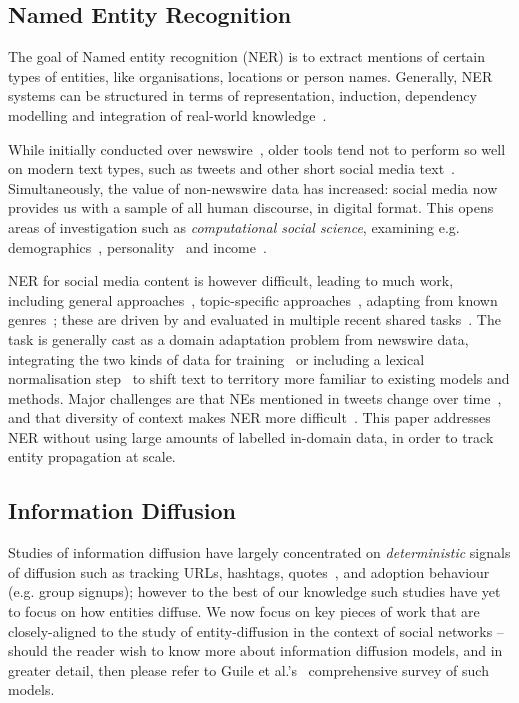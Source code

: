 \documentclass[acmsmall]{acmart}
\begin{document}
\subsection{Named Entity Recognition}
The goal of Named entity recognition (NER) is to extract mentions of certain types of entities, like organisations, locations or person names.
Generally, NER systems can be structured in terms of representation, induction, dependency modelling and integration of real-world knowledge~\cite{nadeau2007survey,ratinov2009design}.

While initially conducted over newswire~\cite{tjong2003introduction}, older tools tend not to perform so well on modern text types, such as tweets and other short social media text~\cite{derczynski2015analysis}.
Simultaneously, the value of non-newswire data has increased: social media now provides us with a sample of all human discourse, %
in digital format. This opens areas of investigation such as {\em computational social science}, examining e.g. demographics~\cite{hovy2015user}, personality~\cite{plank2015personality} and income~\cite{preoctiuc2015studying}.

NER for social media content is however difficult, leading to much work, including general approaches~\cite{ritter2011named}, topic-specific approaches~\cite{liu2011recognizing}, adapting from known genres~\cite{plank2014adapting}; these are driven by and evaluated in multiple recent shared tasks~\cite{rowe2015microposts2015,baldwin2015shared}.
The task is generally cast as a domain adaptation problem from newswire data, integrating the two kinds of data for training~\cite{cherryunreasonable} or including a lexical normalisation step~\cite{han2011lexical} to shift text to territory more familiar to existing models and methods.
Major challenges are that NEs mentioned in tweets change over time~\cite{fromreide2014crowdsourcing}, and that diversity of context makes NER more difficult~\cite{derczynski2015analysis}. 
This paper addresses NER without using large amounts of labelled in-domain data, in order to track entity propagation at scale.%

\subsection{Information Diffusion}
Studies of information diffusion have largely concentrated on \emph{deterministic} signals of diffusion such as tracking URLs, hashtags, quotes~\cite{suen2013nifty}, and adoption behaviour (e.g. group signups); however to the best of our knowledge such studies have yet to focus on how entities diffuse.
We now focus on key pieces of work that are closely-aligned to the study of entity-diffusion in the context of social networks -- should the reader wish to know more about information diffusion models, and in greater detail, then please refer to Guile et al.'s~\cite{guille2013information} comprehensive survey of such models.
\end{document}
